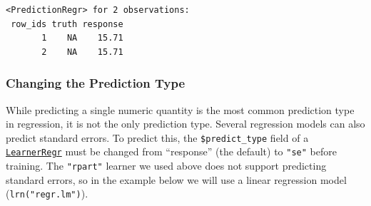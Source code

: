\begin{Shaded}
\begin{Highlighting}[]
\OtherTok{=} \NormalTok{(} \NormalTok{(}\NormalTok{, }\NormalTok{), } \NormalTok{(}\NormalTok{, }\NormalTok{),}
   \NormalTok{(}\NormalTok{, }\NormalTok{), } \NormalTok{(}\NormalTok{, }\NormalTok{), } \NormalTok{(}\NormalTok{, }\NormalTok{),}
   \NormalTok{(}\NormalTok{, }\NormalTok{), } \NormalTok{(}\NormalTok{, }\NormalTok{), } \NormalTok{(}\NormalTok{, }\NormalTok{),}
   \NormalTok{(}\NormalTok{, }\NormalTok{), } \NormalTok{(}\NormalTok{, }\NormalTok{))}
\OtherTok{=}\SpecialCharTok{$}
\end{Highlighting}
\end{Shaded}

\begin{verbatim}
<PredictionRegr> for 2 observations:
 row_ids truth response
       1    NA    15.71
       2    NA    15.71
\end{verbatim}

\hypertarget{changing-the-prediction-type}{%
\subsubsection*{Changing the Prediction
Type}\label{changing-the-prediction-type}}

While predicting a single numeric quantity is the most common prediction
type in regression, it is not the only prediction type. Several
regression models can also predict standard errors. To predict this, the
\texttt{\$predict\_type}
field of a
\href{https://mlr3.mlr-org.com/reference/LearnerRegr.html}{\texttt{LearnerRegr}}
must be changed from ``response'' (the default) to \texttt{"se"} before
training. The \texttt{"rpart"} learner we used above does not support
predicting standard errors, so in the example below we will use a linear
regression model (\texttt{lrn("regr.lm")}).

